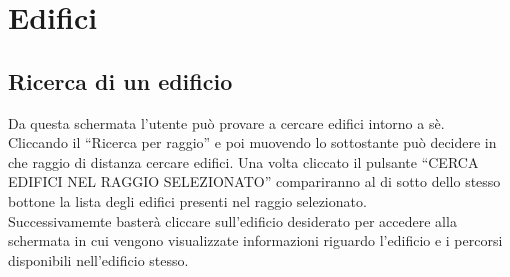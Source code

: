 \section{Edifici}
\subsection{Ricerca di un edificio}
Da questa schermata l'utente può provare a cercare edifici intorno a sè. \\ Cliccando il  ``Ricerca per raggio'' e poi muovendo lo  sottostante può decidere in che raggio di distanza cercare edifici. Una volta cliccato il pulsante ``CERCA EDIFICI NEL RAGGIO SELEZIONATO'' compariranno al di sotto dello stesso bottone la lista degli edifici presenti nel raggio selezionato. \\ 
Successivamemte basterà cliccare sull'edificio desiderato per accedere alla schermata in cui vengono visualizzate informazioni riguardo l'edificio e i percorsi disponibili nell'edificio stesso.
